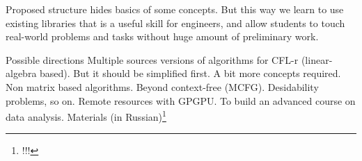 \documentclass[sigconf]{acmart}
\begin{document}
Proposed structure hides basics of some concepts. But this way we learn to use existing libraries that is a useful skill for engineers, and allow students to touch real-world problems and tasks without huge amount of preliminary work.

Possible directions 
Multiple sources versions of algorithms for CFL-r (linear-algebra based). But it should be simplified first. A bit more concepts required.
Non matrix based algorithms.
Beyond context-free (MCFG). Desidability problems, so on.
Remote resources with GPGPU.
To build an advanced course on data analysis. 
Materials (in Russian)\footnote{!!!}



\end{document}
